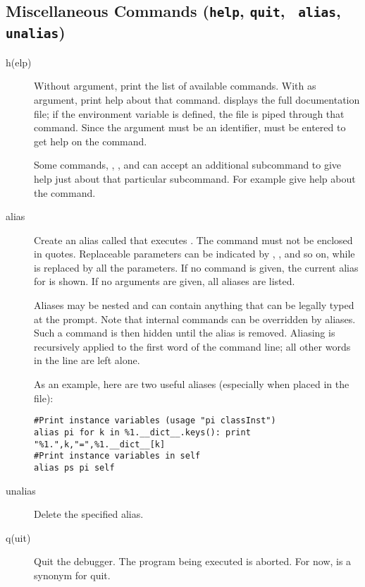 \subsection{Miscellaneous Commands ({\tt help}, {\tt quit}, {\tt
    alias}, {\tt unalias})\label{subsection-misc}}

\begin{description}

\item[h(elp) ]

Without argument, print the list of available commands.  With
 as argument, print help about that command.   displays the full documentation file; if the environment
variable  is defined, the file is piped through that
command.  Since the  argument must be an identifier,
 must be entered to get help on the \samp{!} command.

Some commands, , , and  can accept an
additional subcommand to give help just about that particular
subcommand. For example  give help about the
 command.

\item[alias ]\label{command:aliases}

Create an alias called  that executes .  The
command must not be enclosed in quotes.  Replaceable parameters
can be indicated by , , and so on, while \samp{\%*} is
replaced by all the parameters.  If no command is given, the current
alias for  is shown. If no arguments are given, all
aliases are listed.

Aliases may be nested and can contain anything that can be legally
typed at the  prompt.  Note that internal 
commands can be overridden by aliases.  Such a command is then hidden
until the alias is removed.  Aliasing is recursively applied to the
first word of the command line; all other words in the line are left
alone.

As an example, here are two useful aliases (especially when placed
in the  file):

\begin{verbatim}
#Print instance variables (usage "pi classInst")
alias pi for k in %1.__dict__.keys(): print "%1.",k,"=",%1.__dict__[k]
#Print instance variables in self
alias ps pi self
\end{verbatim}
                
\item[unalias ]

Delete the specified alias.

\item[q(uit)]

Quit the debugger. The program being executed is aborted. For now,
 is a synonym for quit.

\end{description}

